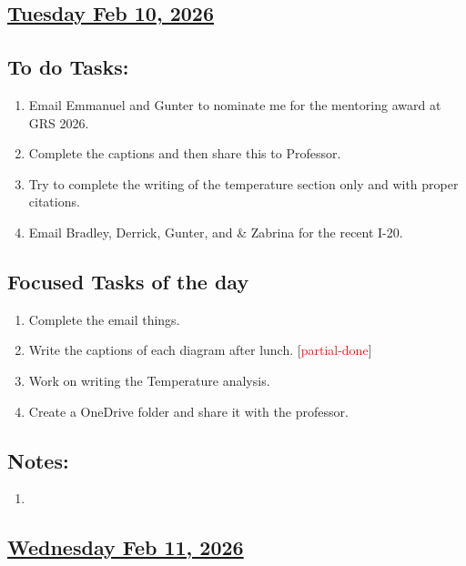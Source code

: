\subsection*{\underline{Tuesday Feb 10, 2026}}
\subsection*{To do Tasks:}
\begin{enumerate}
    \item Email Emmanuel and Gunter to nominate me for the mentoring award at GRS 2026. \cmark
    \item Complete the captions and then share this to Professor. \cmark
    \item Try to complete the writing of the temperature section only and with proper citations. \xmark
    \item Email Bradley, Derrick, Gunter, and \& Zabrina for the recent I-20. \cmark
\end{enumerate}
\subsection*{Focused Tasks of the day}
\begin{enumerate}  
    \item Complete the email things. \cmark  
    \item Write the captions of each diagram after lunch. [\textcolor{red}{partial-done}]
    \item Work on writing the Temperature analysis. \xmark
    \item Create a OneDrive folder and share it with the professor. \cmark
\end{enumerate}
\subsection*{Notes:}
\begin{enumerate}
    \item 
\end{enumerate}
\subsection*{\underline{Wednesday Feb 11, 2026} }
